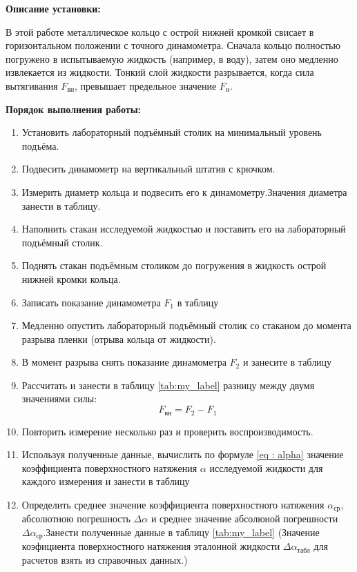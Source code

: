 \vspace{0.5cm}

\textbf{Описание установки:}

В этой работе металлическое кольцо с острой нижней кромкой свисает в горизонтальном положении с точного динамометра. Сначала кольцо полностью погружено в испытываемую жидкость (например, в воду), затем оно медленно извлекается из жидкости. Тонкий слой жидкости разрывается, когда сила вытягивания $F_\text{вн}$, превышает предельное значение $F_\text{н}$.

\vspace{0.5cm}

\textbf{Порядок выполнения работы:}
\begin{enumerate}
    \item {Установить лабораторный подъёмный столик на минимальный уровень подъёма.}
    \item {Подвесить динамометр на вертикальный штатив с крючком.}
    \item {Измерить диаметр кольца и подвесить его к динамометру.Значения диаметра занести в таблицу.}
    \item {Наполнить стакан исследуемой жидкостью и поставить его на лабораторный подъёмный столик.}
    \item {Поднять стакан подъёмным столиком до погружения в жидкость острой нижней кромки кольца.}
    \item {Записать показание динамометра $F_1$ в таблицу}
    \item {Медленно опустить лабораторный подъёмный столик со стаканом до момента разрыва пленки (отрыва кольца от жидкости).}
    \item {В момент разрыва снять показание динамометра $F_2$ и занесите в таблицу}
    \item {
        Рассчитать и занести в таблицу \ref{tab:my_label} разницу между двумя значениями силы:
        \begin{equation*}
            F_\text{вн} = F_2 - F_1
        \end{equation*}
    }
    \item {Повторить измерение несколько раз и проверить воспроизводимость.}
    \item {Используя полученные данные, вычислить по формуле \ref{eq : alpha} значение коэффициента поверхностного натяжения $\alpha$ исследуемой жидкости для каждого измерения и занести в таблицу}
    \item {Определить среднее значение коэффициента поверхностного натяжения $\alpha _\text{ср}$, абсолютною погрешность $\Delta \alpha$ и среднее значение абсолюной погрешности $\Delta \alpha _\text{ср}$.Занести полученные данные в таблицу \ref{tab:my_label} (Значение коэфициента поверхностного натяжения эталонной жидкости $\Delta \alpha _\text{табл}$ для расчетов взять из справочных данных.)}

\end{enumerate}
